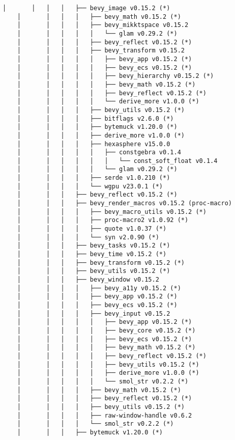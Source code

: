 \begin{lstlisting}[style=mystyle, caption={dependencias del proyecto}, label={lst:dependencias}]
    │       │   │   │   ├── bevy_image v0.15.2 (*)
    │       │   │   │   ├── bevy_math v0.15.2 (*)
    │       │   │   │   ├── bevy_mikktspace v0.15.2
    │       │   │   │   │   └── glam v0.29.2 (*)
    │       │   │   │   ├── bevy_reflect v0.15.2 (*)
    │       │   │   │   ├── bevy_transform v0.15.2
    │       │   │   │   │   ├── bevy_app v0.15.2 (*)
    │       │   │   │   │   ├── bevy_ecs v0.15.2 (*)
    │       │   │   │   │   ├── bevy_hierarchy v0.15.2 (*)
    │       │   │   │   │   ├── bevy_math v0.15.2 (*)
    │       │   │   │   │   ├── bevy_reflect v0.15.2 (*)
    │       │   │   │   │   └── derive_more v1.0.0 (*)
    │       │   │   │   ├── bevy_utils v0.15.2 (*)
    │       │   │   │   ├── bitflags v2.6.0 (*)
    │       │   │   │   ├── bytemuck v1.20.0 (*)
    │       │   │   │   ├── derive_more v1.0.0 (*)
    │       │   │   │   ├── hexasphere v15.0.0
    │       │   │   │   │   ├── constgebra v0.1.4
    │       │   │   │   │   │   └── const_soft_float v0.1.4
    │       │   │   │   │   └── glam v0.29.2 (*)
    │       │   │   │   ├── serde v1.0.210 (*)
    │       │   │   │   └── wgpu v23.0.1 (*)
    │       │   │   ├── bevy_reflect v0.15.2 (*)
    │       │   │   ├── bevy_render_macros v0.15.2 (proc-macro)
    │       │   │   │   ├── bevy_macro_utils v0.15.2 (*)
    │       │   │   │   ├── proc-macro2 v1.0.92 (*)
    │       │   │   │   ├── quote v1.0.37 (*)
    │       │   │   │   └── syn v2.0.90 (*)
    │       │   │   ├── bevy_tasks v0.15.2 (*)
    │       │   │   ├── bevy_time v0.15.2 (*)
    │       │   │   ├── bevy_transform v0.15.2 (*)
    │       │   │   ├── bevy_utils v0.15.2 (*)
    │       │   │   ├── bevy_window v0.15.2
    │       │   │   │   ├── bevy_a11y v0.15.2 (*)
    │       │   │   │   ├── bevy_app v0.15.2 (*)
    │       │   │   │   ├── bevy_ecs v0.15.2 (*)
    │       │   │   │   ├── bevy_input v0.15.2
    │       │   │   │   │   ├── bevy_app v0.15.2 (*)
    │       │   │   │   │   ├── bevy_core v0.15.2 (*)
    │       │   │   │   │   ├── bevy_ecs v0.15.2 (*)
    │       │   │   │   │   ├── bevy_math v0.15.2 (*)
    │       │   │   │   │   ├── bevy_reflect v0.15.2 (*)
    │       │   │   │   │   ├── bevy_utils v0.15.2 (*)
    │       │   │   │   │   ├── derive_more v1.0.0 (*)
    │       │   │   │   │   └── smol_str v0.2.2 (*)
    │       │   │   │   ├── bevy_math v0.15.2 (*)
    │       │   │   │   ├── bevy_reflect v0.15.2 (*)
    │       │   │   │   ├── bevy_utils v0.15.2 (*)
    │       │   │   │   ├── raw-window-handle v0.6.2
    │       │   │   │   └── smol_str v0.2.2 (*)
    │       │   │   ├── bytemuck v1.20.0 (*)

\end{lstlisting}
